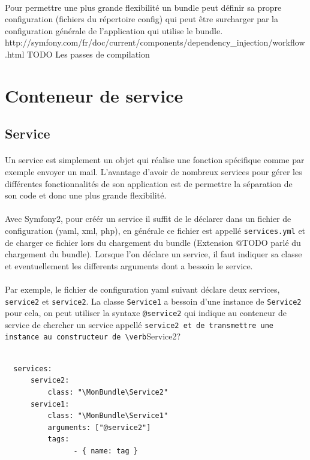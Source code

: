 \paragraph{}
Pour permettre une plus grande flexibilité un bundle peut définir sa propre configuration (fichiers du répertoire config) qui peut être surcharger par la configuration générale de l'application qui utilise le bundle.
http://symfony.com/fr/doc/current/components/dependency_injection/workflow.html
TODO Les passes de compilation
\section{Conteneur de service}

\subsection{Service}
\paragraph{}
Un service est simplement un objet qui réalise une fonction spécifique comme par exemple envoyer un mail. L'avantage d'avoir de nombreux services pour gérer les différentes fonctionnalités de son application est de permettre la séparation de son code et donc une plus grande flexibilité.
\paragraph{}
Avec Symfony2, pour créér un service il suffit de le déclarer dans un fichier de configuration (yaml, xml, php), en générale ce fichier est appellé \verb?services.yml?
et de charger ce fichier lors du chargement du bundle (Extension @TODO parlé du chargement du bundle).
Lorsque l'on déclare un service, il faut indiquer sa classe et eventuellement les differents arguments dont a bessoin le service.
\paragraph{}
Par exemple, le fichier de configuration yaml suivant déclare deux services, \verb?service2? et \verb?service2?.
La classe \verb?Service1? a bessoin d'une instance de \verb?Service2? pour cela, on peut utiliser la syntaxe \verb?@service2? qui indique au conteneur de service de chercher un service appellé \verb?service2 et de transmettre une instance au constructeur de \verb?Service2?

\begin{verbatim}

  services:
      service2:
          class: "\MonBundle\Service2"
      service1:
          class: "\MonBundle\Service1"
          arguments: ["@service2"]
          tags:
                - { name: tag }

\end{verbatim}
